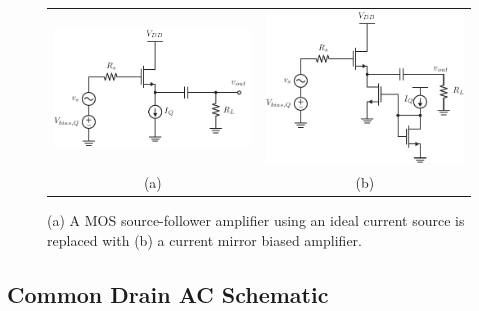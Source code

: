 \begin{figure}[tb]
\begin{center}
\begin{tabular}{cc}
\includegraphics[scale=.8]{cd_amp_dc} &
\includegraphics[scale=.8]{cd_amp_dc_mirror} \\
(a) & (b) \\
\end{tabular}
\end{center}
\caption{(a) A MOS source-follower amplifier using an ideal current source is replaced with (b) a current mirror biased amplifier.} \label{fig:cd_amp_dc}
\end{figure}



\subsection{Common Drain AC Schematic}

